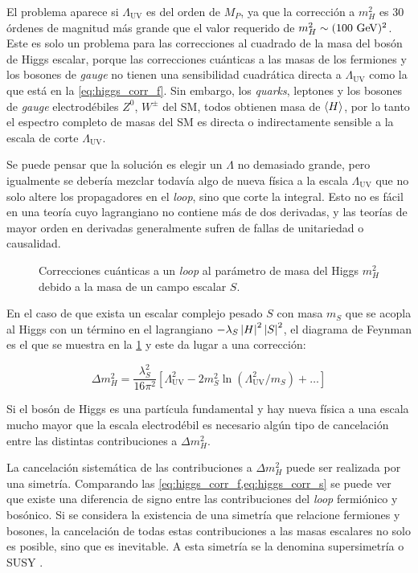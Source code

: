 El problema aparece si $\Lambda_\text{UV}$ es del orden de $M_P$, ya que la
corrección a $m_H^2$ es 30 órdenes de magnitud más grande que el valor requerido
de $m_H^2 \sim (100 \gev)^2$. Este es solo un problema para las correcciones al
cuadrado de la masa del bosón de Higgs escalar, porque las correcciones
cuánticas a las masas de los fermiones y los bosones de \emph{gauge} no tienen una
sensibilidad cuadrática directa a $\Lambda_\text{UV}$ como la que está en la
\cref{eq:higgs_corr_f}. Sin embargo, los \emph{quarks}, leptones y los bosones de \emph{gauge}
electrodébiles $Z^0$, $W^{\pm}$ del SM, todos obtienen masa de $\langle H \rangle$, por
lo tanto el espectro completo de masas del SM es directa o indirectamente
sensible a la escala de corte $\Lambda_\text{UV}$.

Se puede pensar que la solución es elegir un $\Lambda$ no demasiado grande, pero
igualmente se debería mezclar todavía algo de nueva física a la escala
$\Lambda_\text{UV}$ que no solo altere los propagadores en el \emph{loop}, sino que
corte la integral. Esto no es fácil en una teoría cuyo lagrangiano no contiene
más de dos derivadas, y las teorías de mayor orden en derivadas generalmente
sufren de fallas de unitariedad o causalidad.

\begin{figure}[!htbp]
  \centering 
  \caption{Correcciones cuánticas a un \emph{loop} al parámetro de masa del Higgs
    $m_H^2$ debido a la masa de un campo escalar $S$.}
  \label{fig:higgs_correction_s}
\end{figure}

En el caso de que exista un escalar complejo pesado $S$ con masa $m_S$ que se
acopla al Higgs con un término en el lagrangiano $-\lambda_S \left| H \right|^2
\left| S \right|^2$, el diagrama de Feynman es el que se muestra en la
\cref{fig:higgs_correction_s} y este da lugar a una corrección:

\begin{equation}
  \Delta m_H^2 = \frac{\lambda_S^2}{16\pi^2} \left[ \Lambda^2_\text{UV} - 2
    m_S^2 \ln (\Lambda^2_\text{UV}/m_S) + \ldots \right]
  \label{eq:higgs_corr_s}
\end{equation}

Si el bosón de Higgs es una partícula fundamental y hay nueva física a una escala
mucho mayor que la escala electrodébil
es necesario algún tipo de cancelación entre las
distintas contribuciones a $\Delta m_H^2$.

La cancelación sistemática de las contribuciones a $\Delta m_H^2$ puede ser
realizada por una simetría. Comparando las
\cref{eq:higgs_corr_f,eq:higgs_corr_s} se puede ver que existe una diferencia de
signo entre las contribuciones del \emph{loop} fermiónico y bosónico. Si se
considera la existencia de una simetría que relacione fermiones y bosones, la
cancelación de todas estas contribuciones a las masas escalares no solo es
posible, sino que es inevitable. A esta simetría se la denomina supersimetría o
SUSY \cite{Martin:1997ns}.

